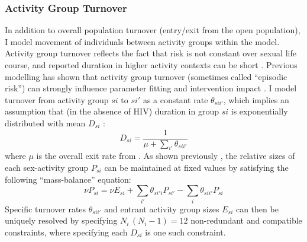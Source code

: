 \subsubsection{Activity Group Turnover}\label{model.par.turnover.act}
In addition to overall population turnover (entry/exit from the open population),
I model movement of individuals between activity groups within the model.
Activity group turnover reflects the fact that risk is not constant over sexual life course,
and reported duration in higher activity contexts can be short \cite{Scorgie2012}.
Previous modelling has shown that activity group turnover (sometimes called ``episodic risk'')
can strongly influence parameter fitting and intervention impact \cite{Henry2015,Knight2020}.
I model turnover from activity group $si$ to $si'$ as a constant rate $\theta_{sii'}$,
which implies an assumption that (in the absence of HIV) duration in group $si$ is
exponentially distributed with mean $D_{si}$ \cite{Roberts2015}:
\begin{equation}\label{eq:model.par.dur}
  D_{si} = \frac{1}{\mu + \sum_{i'}\theta_{sii'}}
\end{equation}
where $\mu$ is the overall exit rate from .
As shown previously \cite{Knight2020}, the relative sizes of each sex-activity group $P_{si}$
can be maintained at fixed values by satisfying the following ``mass-balance'' equation:
\begin{equation}
  \nu P_{si} = \nu E_{si} + \sum_{i'} \theta_{si'i} P_{si'} - \sum_{i} \theta_{sii'} P_{si}
\end{equation}
Specific turnover rates $\theta_{sii'}$ and entrant activity group sizes $E_{si}$
can then be uniquely resolved by specifying
$N_i\,(N_i-1) = 12$ non-redundant and compatible constraints,
where specifying each $D_{si}$ is one such constraint.
